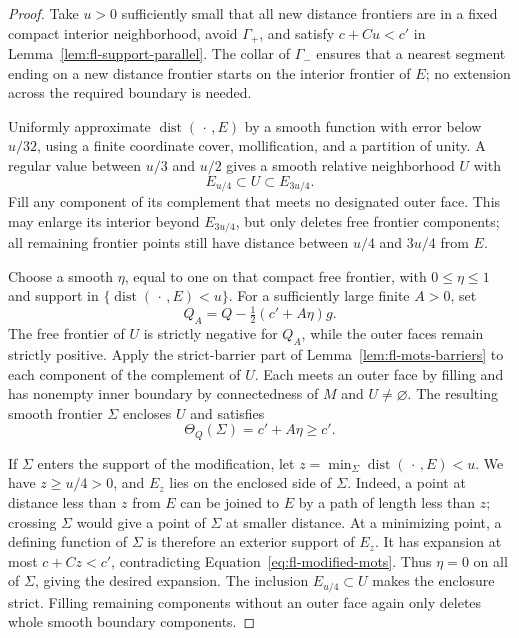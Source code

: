 \begin{proof}
Take \(u>0\) sufficiently small that all new distance frontiers are in
a fixed compact interior neighborhood, avoid \(\Gamma_+\), and satisfy
\(c+Cu<c'\) in Lemma~\ref{lem:fl-support-parallel}.
The collar of \(\Gamma_-\) ensures that a nearest segment ending on a
new distance frontier starts on the interior frontier of \(E\);
no extension across the required boundary is needed.

Uniformly approximate \(\operatorname{dist}(\,\cdot\,,E)\) by a smooth
function with error below \(u/32\), using a finite coordinate cover,
mollification, and a partition of unity.  A regular value between
\(u/3\) and \(u/2\) gives a smooth relative neighborhood \(U\) with
\[
 E_{u/4}\subset U\subset E_{3u/4}.
\]
Fill any component of its complement that meets no designated outer
face.  This may enlarge its interior beyond \(E_{3u/4}\), but only
deletes free frontier components; all remaining frontier points still
have distance between \(u/4\) and \(3u/4\) from \(E\).

Choose a smooth \(\eta\), equal to one on that compact free frontier,
with \(0\le\eta\le1\) and support in
\(\{\operatorname{dist}(\,\cdot\,,E)<u\}\).
For a sufficiently large finite \(A>0\), set
\[
 Q_A=Q-\tfrac12(c'+A\eta)g .
 \]
The free frontier of \(U\) is strictly negative for \(Q_A\), while
the outer faces remain strictly positive.  Apply the strict-barrier
part of Lemma~\ref{lem:fl-mots-barriers} to each component of the
complement of \(U\).  Each meets an outer face by filling and has
nonempty inner boundary by connectedness of \(M\) and \(U\ne\varnothing\).
The resulting smooth frontier \(\Sigma\) encloses \(U\) and satisfies
\begin{equation}
\label{eq:fl-modified-mots}
 \Theta_Q(\Sigma)=c'+A\eta\ge c'.
\end{equation}

If \(\Sigma\) enters the support of the modification, let
\(z=\min_\Sigma\operatorname{dist}(\,\cdot\,,E)<u\).
We have \(z\ge u/4>0\), and \(E_z\) lies on the enclosed side of
\(\Sigma\).  Indeed, a point at distance less than \(z\) from \(E\)
can be joined to \(E\) by a path of length less than \(z\); crossing
\(\Sigma\) would give a point of \(\Sigma\) at smaller distance.
At a minimizing point, a defining function of \(\Sigma\) is therefore
an exterior support of \(E_z\).  It has expansion at most
\(c+Cz<c'\), contradicting Equation~\eqref{eq:fl-modified-mots}.
Thus \(\eta=0\) on all of \(\Sigma\), giving the desired expansion.
The inclusion \(E_{u/4}\subset U\) makes the enclosure strict.
Filling remaining components without an outer face again only deletes
whole smooth boundary components.
\end{proof}

